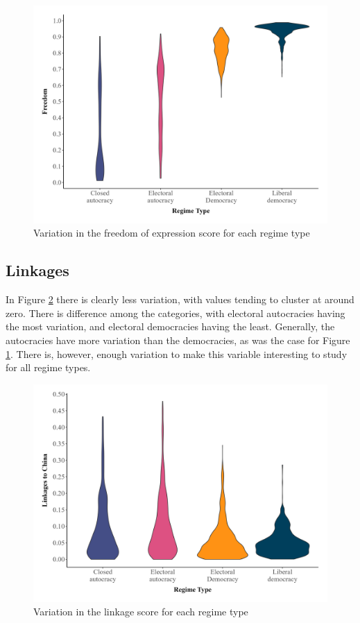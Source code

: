 \begin{figure}[H]
    \centering
    \includegraphics[width=\linewidth]{graphics/variation_freedom.jpeg}
    \caption{Variation in the freedom of expression score for each regime type}
    \label{fig:variation_freedom}
\end{figure}

\subsection{Linkages}
In Figure \ref{fig:variation_fbic} there is clearly less variation, with values tending to cluster at around zero. There is difference among the categories, with electoral autocracies having the most variation, and electoral democracies having the least. Generally, the autocracies have more variation than the democracies, as was the case for Figure \ref{fig:variation_freedom}. There is, however, enough variation to make this variable interesting to study for all regime types. 

\begin{figure}[H]
    \centering
    \includegraphics[width=\linewidth]{graphics/variation_fbic.jpeg}
    \caption{Variation in the linkage score for each regime type}
    \label{fig:variation_fbic}
\end{figure}

